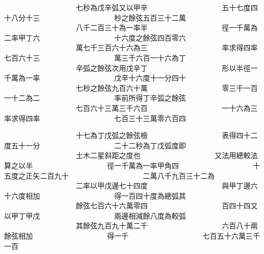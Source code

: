 \begin{正文}
　　　　　　　　　　七秒為戊辛弧又以甲辛
　　　　　　　　　　五十七度四十八分十三
　　　　　　　　　　秒之餘弦五百三十二萬
　　　　　　　　　　八千二百三十為一率半
　　　　　　　　　　徑一千萬為二率甲丁六
　　　　　　　　　　十六度之餘弦四百零六
　　　　　　　　　　萬七千三百六十六為三
　　　　　　　　　　率求得四率七百六十三
　　　　　　　　　　萬三千六百一十六為丁
　　　　　　　　　　辛弧之餘弦次用戊辛丁
　　　　　　　　　　形以半徑一千萬為一率
　　　　　　　　　　戊辛十六度十一分四十
　　　　　　　　　　七秒之餘弦九百六十萬
　　　　　　　　　　零三千一百一十二為二
　　　　　　　　　　率前所得丁辛弧之餘弦
　　　　　　　　　　七百六十三萬三千六百
　　　　　　　　　　一十六為三率求得四率
　　　　　　　　　　七百三十三萬零六百四
\par
\end{正文}\clearpage
{}
\begin{正文}
　　　　　　　　　　十七為丁戊弧之餘弦檢
　　　　　　　　　　表得四十二度五十一分
　　　　　　　　　　二十二秒為丁戊弧度即
　　　　　　　　　　土木二星斜距之度也
　　　　　　　　　　又法用總較法算之以半
　　　　　　　　　　徑一千萬為一率甲角四
　　　　　　　　　　十五度之正矢二百九十
　　　　　　　　　　二萬八千九百三十二為
　　　　　　　　　　二率以甲戊邊七十四度
　　　　　　　　　　與甲丁邊六十六度相加
　　　　　　　　　　得一百四十度為總弧其
　　　　　　　　　　餘弦七百六十六萬零四
　　　　　　　　　　百四十四又以甲丁甲戊
　　　　　　　　　　兩邊相減餘八度為較弧
　　　　　　　　　　其餘弦九百九十萬二千
　　　　　　　　　　六百八十兩餘弦相加
　　　　　　　　　　得一千
　　　　　　　　　　七百五十六萬三千一百
\par
\end{正文}\clearpage
{}
